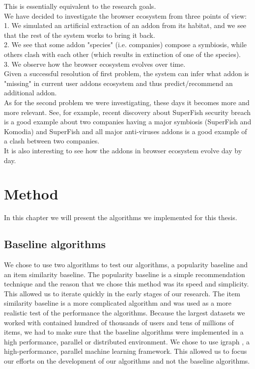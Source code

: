 \documentclass[11pt,oneside]{book}
\let\Oldsection\section
\renewcommand{\section}{\FloatBarrier\Oldsection}
\begin{document}
This is essentially equivalent to the research goals.\\
We have decided to investigate the browser ecosystem from three points of view:\\
1. We simulated an artificial extraction of an addon from its habitat, and we see that the rest of the system works to bring it back.\\
2. We see that some addon "species" (i.e. companies) compose a symbiosis, while others clash with each other (which results in extinction of one of the species).\\
3. We observe how the browser ecosystem evolves over time.\\
Given a successful resolution of first problem, the system can infer what addon is "missing" in current user addons ecosystem and thus predict/recommend an additional addon.\\
As for the second problem we were investigating, these days it becomes more and more relevant. See, for example, recent discovery about SuperFish security breach is a good example about two companies having a major symbiosis (SuperFish and Komodia) and SuperFish and all major anti-viruses addons is a good example of a clash between two companies.\\
It is also interesting to see how the addons in browser ecosystem evolve day by day.

\chapter{Method}
\label{sec:method}
In this chapter we will present the algorithms we implemented for this thesis.
\section{Baseline algorithms}
We chose to use two algorithms to test our algorithms, a popularity baseline and an item similarity baseline. The popularity baseline is a simple recommendation technique and the reason that we chose this method was its speed and simplicity. This allowed us to iterate quickly in the early stages of our research. The item similarity baseline is a more complicated algorithm and was used as a more realistic test of the performance the algorithms. Because the largest datasets we worked with contained hundred of thousands of users and tens of millions of items, we had to make sure that the
baseline algorithms were implemented in a high performance, parallel or distributed
environment. We chose to use igraph \citep{igraph}, a high-performance, parallel machine learning framework. This allowed us to focus our efforts on the development of our algorithms and not the baseline algorithms.
\end{document}
